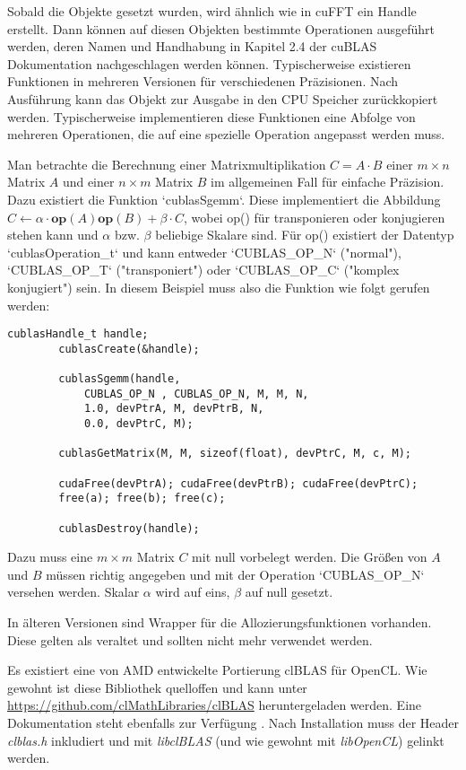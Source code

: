 		Sobald die Objekte gesetzt wurden, wird ähnlich wie in cuFFT ein \Gls{Handle} erstellt. Dann können auf diesen Objekten bestimmte Operationen ausgeführt werden, deren Namen und Handhabung in Kapitel 2.4 der cuBLAS Dokumentation \autocite{cublasDoc} nachgeschlagen werden können. Typischerweise existieren Funktionen in mehreren Versionen für verschiedenen Präzisionen. Nach Ausführung kann das Objekt zur Ausgabe in den CPU Speicher zurückkopiert werden. Typischerweise implementieren diese Funktionen eine Abfolge von mehreren Operationen, die auf eine spezielle Operation angepasst werden muss.
		
		Man betrachte die Berechnung einer Matrixmultiplikation $C = A\cdot B$ einer $m\times n$ Matrix $A$ und einer $n\times m$ Matrix $B$ im allgemeinen Fall für einfache Präzision. Dazu existiert die Funktion \li`cublasSgemm`. Diese implementiert die Abbildung $C \leftarrow \alpha\cdot\textbf{op}(A)\textbf{op}(B) + \beta\cdot C$, wobei op() für transponieren oder konjugieren stehen kann und $\alpha$ bzw. $\beta$ beliebige Skalare sind. Für op() existiert der Datentyp \li`cublasOperation_t` und kann entweder \li`CUBLAS_OP_N` ("normal"), \li`CUBLAS_OP_T` ("transponiert") oder \li`CUBLAS_OP_C` ("komplex konjugiert") sein. In diesem Beispiel muss also die Funktion wie folgt gerufen werden: 
		\begin{lstlisting}[caption=cuBLAS: Funktionsaufruf]
		cublasHandle_t handle;
		cublasCreate(&handle);
		
		cublasSgemm(handle, 
			CUBLAS_OP_N , CUBLAS_OP_N, M, M, N, 
			1.0, devPtrA, M, devPtrB, N, 
			0.0, devPtrC, M);
		
		cublasGetMatrix(M, M, sizeof(float), devPtrC, M, c, M);
		
		cudaFree(devPtrA); cudaFree(devPtrB); cudaFree(devPtrC);			
		free(a); free(b); free(c);
		
		cublasDestroy(handle);
		\end{lstlisting}
		
		Dazu muss eine $m\times m$ Matrix $C$ mit null vorbelegt werden. Die Größen von $A$ und $B$ müssen richtig angegeben und mit der Operation \li`CUBLAS_OP_N` versehen werden. Skalar $\alpha$ wird auf eins, $\beta$ auf null gesetzt. 
		
		In älteren Versionen sind Wrapper für die Allozierungsfunktionen vorhanden. Diese gelten als veraltet und sollten nicht mehr verwendet werden.
		
		Es existiert eine von AMD entwickelte Portierung clBLAS für OpenCL. Wie gewohnt ist diese Bibliothek quelloffen und kann unter \url{https://github.com/clMathLibraries/clBLAS} heruntergeladen werden. Eine Dokumentation steht ebenfalls zur Verfügung \autocite{clblasDoc}. Nach Installation muss der Header \textit{clblas.h} inkludiert und mit \textit{libclBLAS} (und wie gewohnt mit \textit{libOpenCL}) gelinkt werden.

